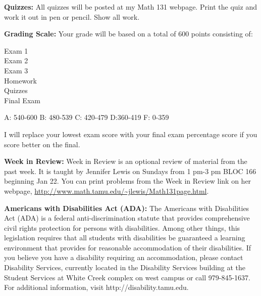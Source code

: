 \documentclass[12pt]{article}
\begin{document}
\vspace*{.15in}
\noindent\textbf{Quizzes:} All quizzes will be posted at my Math 131 webpage. Print the quiz and work it out in pen or pencil. Show all work.

\vspace*{.15in}
\noindent\textbf{Grading Scale:} Your grade will be based on a total of 600 points consisting of: \\
\begin{center}
\begin{minipage}{3in}
\begin{flushleft}
Exam 1    \\
Exam 2    \\
Exam 3      \\
Homework     \\
Quizzes      \\
Final Exam   \\
\end{flushleft}
\end{minipage} 
\end{center}

\begin{center}
A: 540-600  \qquad    B: 480-539  \qquad   C: 420-479   \qquad    D:360-419 \qquad F: 0-359     
\end{center}

I will replace your lowest exam score with your final exam percentage score if you score better on the final.

 
\vspace*{.15in}
\noindent \textbf{Week in Review:} Week in Review is an optional review of material from the past week. It is taught by Jennifer Lewis on Sundays from 1 pm-3 pm BLOC 166 beginning Jan 22. You can print problems from the Week in Review link on her webpage, \url{http://www.math.tamu.edu/~jlewis/Math131page.html}. 
     
\vspace*{.15in}

\noindent \textbf{Americans with Disabilities Act (ADA):} The Americans with Disabilities Act (ADA) is a federal anti-discrimination statute that provides comprehensive civil rights protection for persons with disabilities. Among other things, this legislation requires that all students with disabilities be guaranteed a learning environment that provides for reasonable accommodation of their disabilities. If you believe you have a disability requiring an accommodation, please contact Disability Services, currently located in the Disability Services building at the Student Services at White Creek complex on west campus or call 979-845-1637. For additional information, visit http://disability.tamu.edu.
\end{document}
